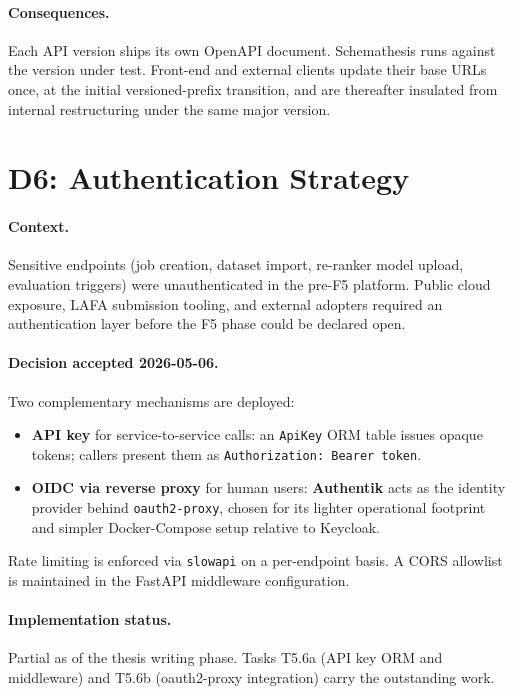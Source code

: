 \paragraph{Consequences.}
Each API version ships its own OpenAPI document. Schemathesis runs against the
version under test. Front-end and external clients update their base URLs once,
at the initial versioned-prefix transition, and are thereafter insulated from
internal restructuring under the same major version.

\section{D6: Authentication Strategy}
\label{app:adr-d6}

\paragraph{Context.}
Sensitive endpoints (job creation, dataset import, re-ranker model upload,
evaluation triggers) were unauthenticated in the pre-F5 platform. Public cloud
exposure, LAFA submission tooling, and external adopters required an
authentication layer before the F5 phase could be declared open.

\paragraph{Decision accepted 2026-05-06.}
Two complementary mechanisms are deployed:

\begin{itemize}
  \item \textbf{API key} for service-to-service calls: an \texttt{ApiKey} ORM
    table issues opaque tokens; callers present them as
    \texttt{Authorization: Bearer \textlangle{}token\textrangle{}}.
  \item \textbf{OIDC via reverse proxy} for human users: \textbf{Authentik}
    acts as the identity provider behind \texttt{oauth2-proxy}, chosen for
    its lighter operational footprint and simpler Docker-Compose setup
    relative to Keycloak.
\end{itemize}

Rate limiting is enforced via \texttt{slowapi} on a per-endpoint basis.
A CORS allowlist is maintained in the FastAPI middleware configuration.

\paragraph{Implementation status.}
Partial as of the thesis writing phase. Tasks T5.6a (API key ORM and
middleware) and T5.6b (oauth2-proxy integration) carry the outstanding work.

